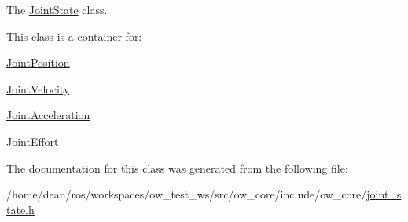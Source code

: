 The \hyperlink{classow__core_1_1JointState}{Joint\+State} class. 

This class is a container for\+:
\begin{DoxyItemize}
\item \hyperlink{classow__core_1_1JointPosition}{Joint\+Position}
\item \hyperlink{classow__core_1_1JointVelocity}{Joint\+Velocity}
\item \hyperlink{classow__core_1_1JointAcceleration}{Joint\+Acceleration}
\item \hyperlink{classow__core_1_1JointEffort}{Joint\+Effort} 
\end{DoxyItemize}

The documentation for this class was generated from the following file\+:\begin{DoxyCompactItemize}
\item 
/home/dean/ros/workspaces/ow\+\_\+test\+\_\+ws/src/ow\+\_\+core/include/ow\+\_\+core/\hyperlink{joint__state_8h}{joint\+\_\+state.\+h}\end{DoxyCompactItemize}
